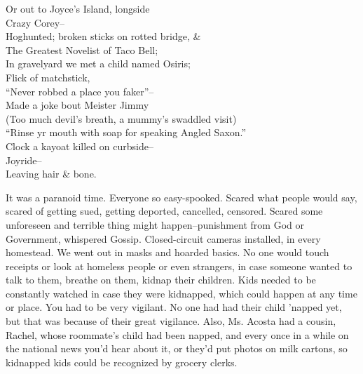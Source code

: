 Or out to Joyce's Island, longside \\
Crazy Corey-- \\
Hoghunted; broken sticks on rotted bridge, \& \\
The Greatest Novelist of Taco Bell; \\ 
In gravelyard we met a child named Osiris; \\
Flick of matchstick, \\
``Never robbed a place you faker''-- \\
Made a joke bout Meister Jimmy \\
(Too much devil's breath, a mummy's swaddled visit) \\
``Rinse yr mouth with soap for speaking Angled Saxon.'' \\
Clock a kayoat killed on curbside-- \\
Joyride-- \\
Leaving hair \& bone.

It was a paranoid time. Everyone so easy-spooked. Scared what people would say, scared of getting sued, getting deported, cancelled, censored. Scared some unforeseen and terrible thing might happen--punishment from God or Government, whispered Gossip. Closed-circuit cameras installed, in every homestead. We went out in masks and hoarded basics. No one would touch receipts or look at homeless people or even strangers, in case someone wanted to talk to them, breathe on them, kidnap their children. Kids needed to be constantly watched in case they were kidnapped, which could happen at any time or place. You had to be very vigilant. No one had had their child 'napped yet, but that was because of their great vigilance. Also, Ms. Acosta had a cousin, Rachel, whose roommate's child had been napped, and every once in a while on the national news you'd hear about it, or they'd put photos on milk cartons, so kidnapped kids could be recognized by grocery clerks. 